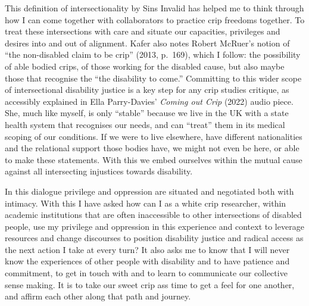 This definition of intersectionality by Sins Invalid has helped me to
think through how I can come together with collaborators to practice
crip freedoms together. To treat these intersections with care and
situate our capacities, privileges and desires into and out of
alignment. Kafer also notes Robert McRuer's notion of ``the non-disabled
claim to be crip'' (2013, p.~169), which I follow: the possibility of
able bodied crips, of those working for the disabled cause, but also
maybe those that recognise the ``the disability to come.'' Committing to
this wider scope of intersectional disability justice is a key step for
any crip studies critique, as accessibly explained in Ella Parry-Davies'
\emph{Coming out Crip} (2022) audio piece. She, much like myself, is
only ``stable'' because we live in the UK with a state health system
that recognises our needs, and can ``treat'' them in its medical scoping
of our conditions. If we were to live elsewhere, have different
nationalities and the relational support those bodies have, we might not
even be here, or able to make these statements. With this we embed
ourselves within the mutual cause against all intersecting injustices
towards disability.

In this dialogue privilege and oppression are situated and negotiated
both with intimacy. With this I have asked how can I as a white crip
researcher, within academic institutions that are often inaccessible to
other intersections of disabled people, use my privilege and oppression
in this experience and context to leverage resources and change
discourses to position disability justice and radical access as the next
action I take at every turn? It also asks me to know that I will never
know the experiences of other people with disability and to have
patience and commitment, to get in touch with and to learn to
communicate our collective sense making. It is to take our sweet crip
ass time to get a feel for one another, and affirm each other along that
path and journey.

